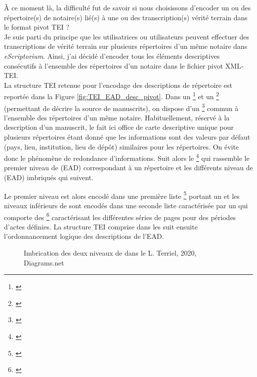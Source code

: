 À ce moment là, la difficulté fut de savoir si nous choisissons d'encoder un ou des répertoire(s) de notaire(s) lié(s) à une ou des transcription(s) vérité terrain dans le format pivot TEI ?\\

Je suis parti du principe que les utilisatrices ou utilisateurs peuvent effectuer des transcriptions de vérité terrain sur plusieurs répertoires d'un même notaire dans \textit{eScriptorium}. Ainsi, j'ai décidé d'encoder tous les éléments descriptives consécutifs à l'ensemble des répertoires d'un notaire dans le fichier pivot XML-TEI.\\

La structure TEI retenue pour l'encodage des descriptions de répertoire est reportée dans la Figure \ref{fig:TEI_EAD_desc_pivot}. Dans un \footnote{\cite{tei_tei_nodate-6}} et un \footnote{\cite{tei_tei_nodate-4}} (permettant de décrire la source de manuscrits), on dispose d'un \footnote{\cite{tei_tei_nodate-22}} commun à l'ensemble des répertoires d'un même notaire. Habituellement, réservé à la description d'un manuscrit, le  fait ici office de carte descriptive unique pour plusieurs répertoires étant donné que les informations sont des valeurs par défaut (pays, lieu, institution, lieu de dépôt) similaires pour les répertoires. On évite donc le phénomène de redondance d'informations. Suit alors le \footnote{\cite{tei_tei_nodate-5}} qui rassemble le premier niveau de  (EAD) correspondant à un répertoire et les différents niveau de  (EAD) imbriqués qui suivent. 

Le premier niveau est alors encodé dans une première liste \footnote{\cite{tei_tei_nodate-21}} portant un   et les niveaux inférieurs de  sont encodés dans une seconde liste  caractérisée par un   qui comporte des \footnote{\cite{tei_tei_nodate-20}}  caractérisant les différentes séries de pages pour des périodes d'actes définies. La structure TEI comprise dans les  suit ensuite l'ordonnancement logique des descriptions de l'EAD.

\begin{wrapfigure}[20]{l}{11cm}
    \centering
    \centerline{}
    \caption{Imbrication des deux niveaux de  dans le  \textcopyright L. Terriel, 2020, Diagrams.net}
    \label{fig:metaliste}
\end{wrapfigure}

